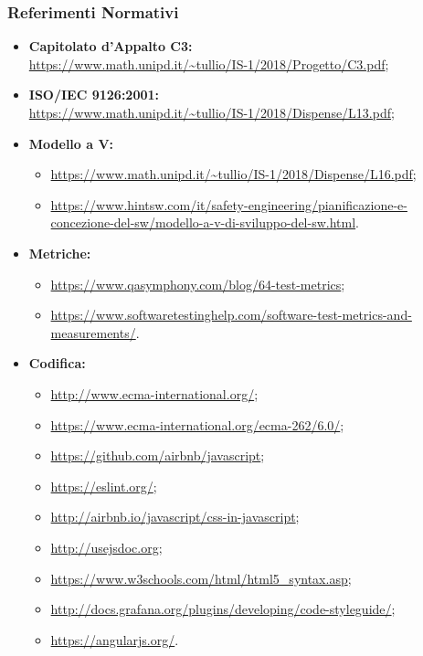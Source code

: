 \subsubsection{Referimenti Normativi}
\begin{itemize}
\item \textbf{Capitolato d'Appalto C3:}\\ \url{https://www.math.unipd.it/~tullio/IS-1/2018/Progetto/C3.pdf};
\item \textbf{ISO/IEC 9126:2001:}\\ \url{https://www.math.unipd.it/~tullio/IS-1/2018/Dispense/L13.pdf};
\item \textbf{Modello a V:}
\begin{itemize}
	\item \url{https://www.math.unipd.it/~tullio/IS-1/2018/Dispense/L16.pdf};
	\item \url{https://www.hintsw.com/it/safety-engineering/pianificazione-e-concezione-del-sw/modello-a-v-di-sviluppo-del-sw.html}.
\end{itemize}
\item \textbf{Metriche:}
	\begin{itemize}
	\item \url{https://www.qasymphony.com/blog/64-test-metrics};
	\item \url{https://www.softwaretestinghelp.com/software-test-metrics-and-measurements/}.
	\end{itemize}
\item \textbf{Codifica:}
	\begin{itemize}
	\item \url{http://www.ecma-international.org/};
	\item \url{https://www.ecma-international.org/ecma-262/6.0/};
	\item \url{https://github.com/airbnb/javascript};
	\item \url{https://eslint.org/};
	\item \url{http://airbnb.io/javascript/css-in-javascript};
	\item \url{http://usejsdoc.org};
	\item \url{https://www.w3schools.com/html/html5_syntax.asp};
	\item \url{http://docs.grafana.org/plugins/developing/code-styleguide/};
	\item \url{https://angularjs.org/}.
	\end{itemize}
\end{itemize}


